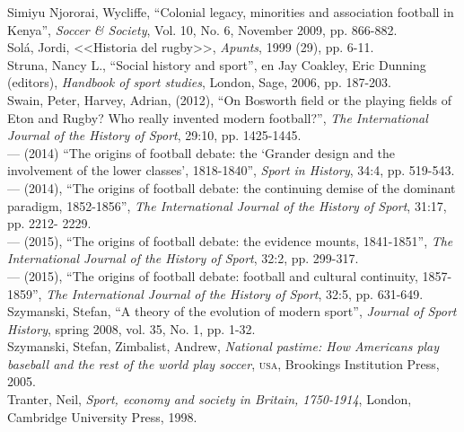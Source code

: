 \documentclass[11pt,a5paper,twoside]{book} %
\begin{document}
\begin{hangparas}{1cm}{1}
\noindent Simiyu Njororai, Wycliffe, “Colonial legacy, minorities and association football in Kenya”,
\emph{Soccer \& Society}, Vol. 10, No. 6, November 2009, pp. 866-882. \\

\noindent Solá, Jordi, <<Historia del rugby>>, \emph{Apunts}, 1999 (29), pp. 6-11. \\

\noindent Struna, Nancy L., “Social history and sport”, en Jay Coakley, Eric Dunning (editors),
\emph{Handbook of sport studies}, London, Sage, 2006, pp. 187-203. \\

\noindent Swain, Peter, Harvey, Adrian, (2012), “On Bosworth field or the playing fields of Eton and Rugby? Who really invented modern football?”, \emph{The International Journal of the History of Sport}, 29:10, pp. 1425-1445. \\

\noindent --- (2014) “The origins of football debate: the ‘Grander design and the involvement of the lower classes’, 1818-1840”, \emph{Sport in History}, 34:4, pp. 519-543. \\

\noindent --- (2014), “The origins of football debate: the continuing demise of the dominant paradigm, 1852-1856”, \emph{The International Journal of the History of Sport}, 31:17, pp. 2212- 2229. \\

\noindent --- (2015), “The origins of football debate: the evidence mounts, 1841-1851”, \emph{The International Journal of the History of Sport}, 32:2, pp. 299-317. \\

\noindent --- (2015), “The origins of football debate: football and cultural continuity, 1857- 1859”, \emph{The International Journal of the History of Sport}, 32:5, pp. 631-649. \\

\noindent Szymanski, Stefan, “A theory of the evolution of modern sport”, \emph{Journal of Sport History}, spring 2008, vol. 35, No. 1, pp. 1-32. \\

\noindent Szymanski, Stefan, Zimbalist, Andrew, \emph{National pastime: How Americans play baseball and the rest of the world play soccer}, \textsc{usa}, Brookings Institution Press, 2005. \\

\noindent Tranter, Neil, \emph{Sport, economy and society in Britain, 1750-1914}, London, Cambridge University Press, 1998. \\


\end{hangparas}
\end{document}
